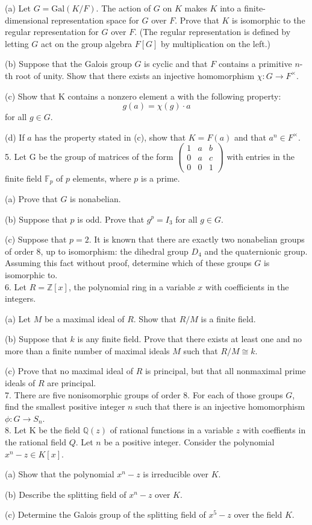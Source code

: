 \documentclass[11pt]{article}
\newcommand{\Z}{\mathbb{Z}}
\newcommand{\Q}{\mathbb{Q}}
\newcommand{\F}{\mathbb{F}}
\begin{document}
(a) Let $G = \mbox{Gal}(K/F)$. The action of $G$ on $K$ makes $K$ into a finite-dimensional representation space for
$G$ over $F$. Prove that $K$ is isomorphic to the regular representation for $G$ over $F$.
(The regular representation is defined by letting $G$ act on the group algebra $F[G]$ by multiplication on the
left.)
	
(b) Suppose that the Galois group $G$ is cyclic and that $F$ contains a primitive $n$-th root of unity. Show that
there exists an injective homomorphism $\chi  : G \to F^\times$.

(c) Show that K contains a nonzero element a with the following property:
\[g(a) = \chi(g) \cdot a\]
for all $g\in G$.

(d) If $a$ has the property stated in (c), show that $K = F(a)$ and that $a^n \in F^\times$.\\

5. Let G be the group of matrices of the form $\begin{pmatrix} 1&a&b\\0&a&c\\0&0&1\end{pmatrix}$ with entries in the finite field $\F_p$ of $p$ elements, where $p$ is a prime.

(a) Prove that $G$ is nonabelian.

(b) Suppose that $p$ is odd. Prove that $g^p  = I_3$ for all $g\in G$. 

(c) Suppose that $p=2$. It is known that there are exactly two nonabelian groups of order 8, up to isomorphism: the dihedral group $D_4$ and the quaternionic group. Assuming this fact without proof, determine which of these groups $G$ is isomorphic to. \\

6. Let $R = \Z[x]$, the polynomial ring in a variable $x$ with coefficients in the integers.

(a)  Let $M$ be a maximal ideal of $R$. Show that $R/M$ is a finite field.


(b)  Suppose that $k$ is any finite field. Prove that there exists at least one and no more than a finite number
of maximal ideals $M$ such that $R/M \cong k$.

(c)  Prove that no maximal ideal of $R$ is principal, but that all nonmaximal prime ideals of $R$ are principal.\\

7. There are five nonisomorphic groups of order 8. For each of those groups $G$, find the smallest positive
integer $n$ such that there is an injective homomorphism $\phi : G \to S_n$.\\

8. Let K be the field $\Q(z)$ of rational functions in a variable $z$ with coeffients in the rational field $Q$. Let $n$
be a positive integer. Consider the polynomial $x^n - z\in  K[x]$.

(a) Show that the polynomial $x^n-z$ is irreducible over $K$.

(b) Describe the splitting field of $x^n- z$ over $K$.

(c) Determine the Galois group of the splitting field of $x^5 - z$ over the field $K$.
\end{document}
